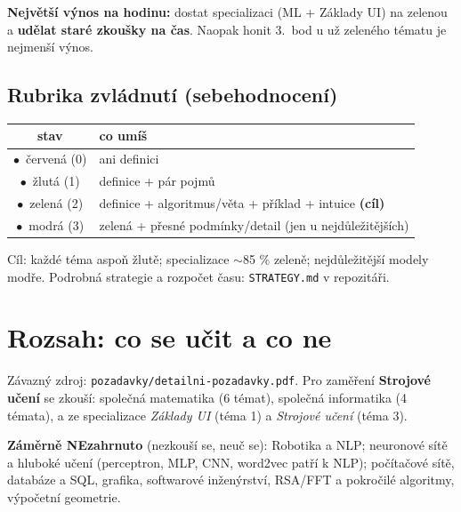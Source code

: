 \documentclass[11pt,a4paper]{article}
\begin{document}
\noindent\textbf{Největší výnos na hodinu:} dostat specializaci (ML + Základy UI) na zelenou a
\textbf{udělat staré zkoušky na čas}. Naopak honit 3.\ bod u už zeleného tématu je nejmenší výnos.

\subsection{Rubrika zvládnutí (sebehodnocení)}
\begin{center}\small
\begin{tabular}{@{}cl@{}}
\toprule
\textbf{stav} & \textbf{co umíš} \\
\midrule
\textcolor{gapred}{$\bullet$}\ červená (0) & ani definici \\
\textcolor{orange!80!black}{$\bullet$}\ žlutá (1) & definice + pár pojmů \\
\textcolor{intugreen}{$\bullet$}\ zelená (2) & definice + algoritmus/věta + příklad + intuice \quad\textbf{(cíl)} \\
\textcolor{defblue}{$\bullet$}\ modrá (3) & zelená + přesné podmínky/detail (jen u nejdůležitějších) \\
\bottomrule
\end{tabular}
\end{center}
\noindent Cíl: každé téma aspoň žlutě; specializace $\sim$85 \% zeleně; nejdůležitější modely modře.
Podrobná strategie a rozpočet času: \texttt{STRATEGY.md} v repozitáři.

\section{Rozsah: co se učit a co ne}
\label{sec:rozsah}
Závazný zdroj: \texttt{pozadavky/detailni-pozadavky.pdf}. Pro zaměření \textbf{Strojové učení}
se zkouší: společná matematika (6 témat), společná informatika (4 témata), a ze specializace
\emph{Základy UI} (téma 1) a \emph{Strojové učení} (téma 3).

\begin{gapbox}
\textbf{Záměrně NEzahrnuto} (nezkouší se, neuč se): Robotika a NLP; neuronové sítě a hluboké
učení (perceptron, MLP, CNN, word2vec patří k NLP); počítačové sítě, databáze a SQL, grafika,
softwarové inženýrství, RSA/FFT a pokročilé algoritmy, výpočetní geometrie.
\end{gapbox}

\clearpage


\clearpage

\clearpage


\clearpage

\clearpage


\clearpage


\clearpage


\clearpage

\end{document}
